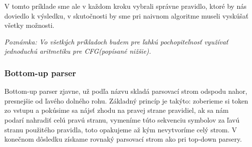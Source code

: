 \documentclass[12pt,a4paper]{report}
\theoremstyle{definition}
\theoremstyle{remark}
\newcommand\tab[1][1cm]{\hspace*{#1}}
\begin{document}
%


V tomto príklade sme ale v každom kroku vybrali správne pravidlo, ktoré by nás doviedlo k výsledku, v skutočnosti by sme pri naivnom algoritme museli vyskúšať všetky možnosti.


\textit{Poznámka: Vo všetkých príkladoch budem pre ľahkú pochopiteľnosť využívať jednoduchú aritmetiku pre CFG(popísané nižšie).} 
\subsubsection*{Bottom-up parser} 

Bottom-up parser zjavne, už podľa názvu skladá parsovací strom odspodu nahor, presnejšie od ľavého dolného rohu. Základný princíp je takýto: zoberieme si token zo vstupu a pokúsime sa nájsť zhodu na pravej strane pravidiel, ak sa nám podarí nahradiť celú pravú stranu, vymeníme túto sekvenciu symbolov za ľavú stranu použitého pravidla, toto opakujeme až kým nevytvoríme celý strom. V konečnom dôsledku získame rovnaký parsovací strom ako pri top-down parsery.
\end{document}
